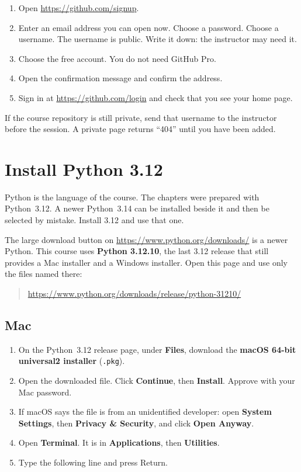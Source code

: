 \documentclass[11pt,a4paper]{article}
\newcommand{\menu}[1]{\textbf{#1}}
\newcommand{\file}[1]{\texttt{#1}}
\begin{document}
\begin{enumerate}
\item Open \url{https://github.com/signup}.
\item Enter an email address you can open now. Choose a password. Choose a username. The username is public. Write it down: the instructor may need it.
\item Choose the free account. You do not need GitHub Pro.
\item Open the confirmation message and confirm the address.
\item Sign in at \url{https://github.com/login} and check that you see your home page.
\end{enumerate}

If the course repository is still private, send that username to the instructor before the session. A private page returns ``404'' until you have been added.

\section{Install Python 3.12}

Python is the language of the course. The chapters were prepared with Python~3.12. A newer Python~3.14 can be installed beside it and then be selected by mistake. Install 3.12 and use that one.

The large download button on \url{https://www.python.org/downloads/} is a newer Python. This course uses \textbf{Python 3.12.10}, the last 3.12 release that still provides a Mac installer and a Windows installer. Open this page and use only the files named there:

\begin{quote}
\url{https://www.python.org/downloads/release/python-31210/}
\end{quote}

\subsection{Mac}

\begin{enumerate}
\item On the Python~3.12 release page, under \menu{Files}, download the \textbf{macOS 64-bit universal2 installer} (\file{.pkg}).
\item Open the downloaded file. Click \menu{Continue}, then \menu{Install}. Approve with your Mac password.
\item If macOS says the file is from an unidentified developer: open \menu{System Settings}, then \menu{Privacy \& Security}, and click \menu{Open Anyway}.
\item Open \menu{Terminal}. It is in \menu{Applications}, then \menu{Utilities}.
\item Type the following line and press Return.
\end{enumerate}
\end{document}
